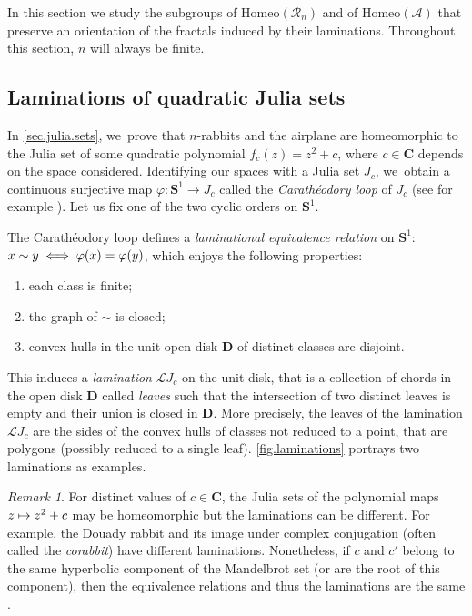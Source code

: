 \documentclass[JEP,XML,SOM,Unicode,NoFloatCountersInSection,published]{cedram}
\newcommand\mto{\mathchoice{\longmapsto}{\mapsto}{\mapsto}{\mapsto}}
\theoremstyle{plain}
\theoremstyle{definition}
\theoremstyle{remark}
\newtheorem{remark}[theorem]{Remark}
\newcommand{\Homeo}{\mathrm{Homeo}}
\newcommand{\A}{\mathcal{A}}
\newcommand{\R}{\mathcal{R}}
\begin{document}
In this section we study the subgroups of $\Homeo(\R_n)$ and of $\Homeo(\A)$ that preserve an orientation of the fractals induced by their laminations.
Throughout this section, $n$ will always be finite.

\subsection{Laminations of quadratic Julia sets}

In \cref{sec.julia.sets}, we~prove that $n$-rabbits and the airplane are homeomorphic to the Julia set of some quadratic polynomial $f_c(z)=z^2+c$, where $c\in\mathbf{C}$ depends on the space considered.
Identifying our spaces with a Julia set $J_c$, we~obtain a continuous surjective map $\varphi\colon \mathbf{S}^1\to J_c$ called the \emph{Carathéodory loop} of $J_c$ (see for example \cite[Exp.\,II]{douady-hubbard-I}).
Let us fix one of the two cyclic orders on $\mathbf{S}^1$.

The Carathéodory loop defines a \emph{laminational equivalence relation} on $\mathbf{S}^1$: $x\sim\nobreak y\iff\varphi(x)=\varphi(y)$,
which enjoys the following properties:
\begin{enumerate}
\item each class is finite;
\item the graph of $\sim$ is closed;
\item convex hulls in the unit open disk $\mathbf{D}$ of distinct classes are disjoint.
\end{enumerate}

This induces a \emph{lamination} $\mathcal{L}J_c$ on the unit disk, that is a collection of chords in the open disk $\mathbf{D}$ called \emph{leaves} such that the intersection of two distinct leaves is empty and their union is closed in $\mathbf{D}$.
More precisely, the leaves of the lamination $\mathcal{L}J_c$ are the sides of the convex hulls of classes not reduced to a point, that are polygons (possibly reduced to a single leaf).
\cref{fig.laminations} portrays two laminations as examples.

\begin{remark}
\label{rmk.hyperbolic components}
For distinct values of $c\in\mathbf{C}$, the Julia sets of the polynomial maps $z\mto z^2+c$ may be homeomorphic but the laminations can be different.
For example, the Douady rabbit and its image under complex conjugation (often called the \textit{corabbit}) have different laminations.
Nonetheless, if $c$ and $c'$ belong to the same hyperbolic component of the Mandelbrot set (or are the root of this component), then the equivalence relations and thus the laminations are the same \cite[Exp.\,XVIII, Prop.\,1]{douady-hubbard-II}.
\end{remark}
\end{document}
